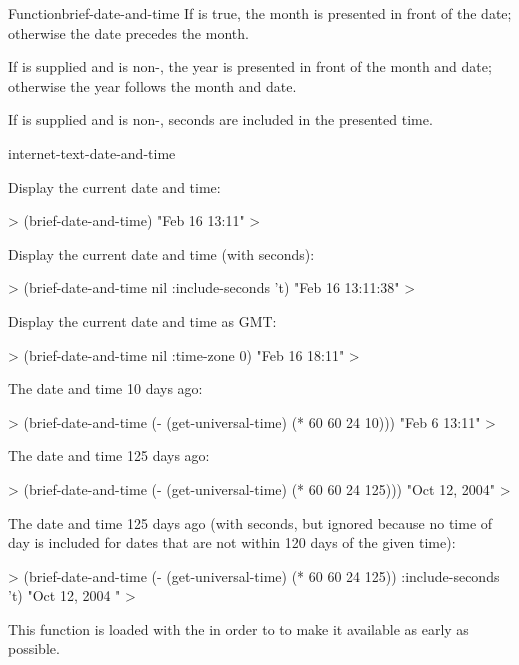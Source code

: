 \documentclass[10pt,twoside,english,pdftex]{article}
\begin{document}
\begin{functiondoc}{Function}{brief-date-and-time}
\W{} 
%
If  is true, the month is presented in front of the
date; otherwise the date precedes the month.

\W{} 
%
If  is supplied and is non-\nil, the year is presented in
front of the month and date; otherwise the year follows the month and date.

\W{} 
%
If  is supplied and is non-\nil, seconds are included
in the presented time.

\begin{alsos}{internet-text-date-and-time}
\end{alsos}

\fnexamples
Display the current date and time: 
%
\W\supp
\begin{example}
  > (brief-date-and-time)
  "Feb 16 13:11"
  >
\end{example}
%
Display the current date and time (with seconds):
%
\W\supp\notpretop
\begin{example}
  > (brief-date-and-time nil :include-seconds 't)
  "Feb 16 13:11:38"
  >
\end{example}
%
Display the current date and time as GMT: 
%
\W\supp\notpretop
\begin{example}
  > (brief-date-and-time nil :time-zone 0)
  "Feb 16 18:11"
  >
\end{example}
%
The date and time 10 days ago:
%
\W\supp\notpretop
\begin{example}
  > (brief-date-and-time (- (get-universal-time) (* 60 60 24 10)))
  "Feb  6 13:11"
  >
\end{example}
%
The date and time 125 days ago:
%
\W\supp\notpretop
\begin{example}
  > (brief-date-and-time (- (get-universal-time) (* 60 60 24 125)))
  "Oct 12, 2004"
  >
\end{example}
%
The date and time 125 days ago (with seconds, but ignored because no time of
day is included for dates that are not within 120 days of the given time):
%
\W\supp\notpretop
\begin{example}
  > (brief-date-and-time (- (get-universal-time) (* 60 60 24 125)) :include-seconds 't)
  "Oct 12, 2004   "
  >
\end{example}

\fnnote
{}%
%
%
This function is loaded with the  
in order to to make it available as early as possible.

\end{functiondoc}
\end{document}
